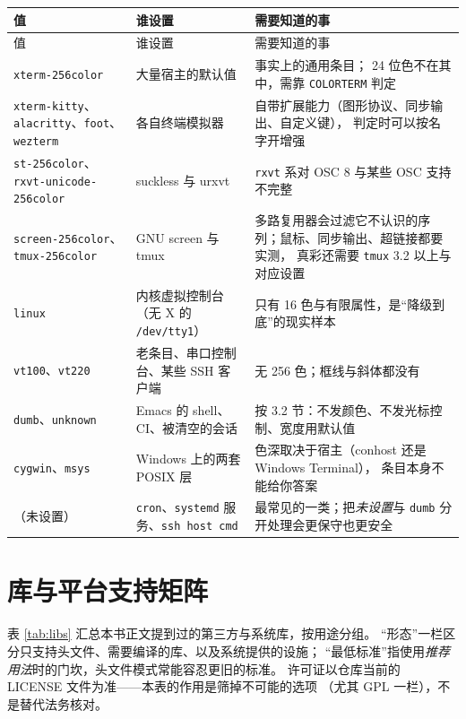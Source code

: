 \documentclass[12pt,a4paper,fontset=fandol]{ctexbook}
\newcommand{\Tp}[1]{\texttt{#1}}
\newcommand{\Bk}{\allowbreak}
\begin{document}
\begin{longtable}{@{}>{\raggedright\arraybackslash}p{}
                 >{\raggedright\arraybackslash}p{}
                 >{\raggedright\arraybackslash}p{}@{}}
\toprule
值 & 谁设置 & 需要知道的事 \\
\midrule
\endfirsthead
\toprule
值 & 谁设置 & 需要知道的事 \\
\midrule
\endhead
\Tp{xterm\Bk-256color} & 大量宿主的默认值 & 事实上的通用条目；
24 位色不在其中，需靠 \Tp{COLORTERM} 判定 \\
\Tp{xterm-kitty}、\Tp{alacritty}、\Tp{foot}、\Tp{wezterm} &
各自终端模拟器 & 自带扩展能力（图形协议、同步输出、自定义键），
判定时可以按名字开增强 \\
\Tp{st-256color}、\Tp{rxvt\Bk-unicode\Bk-256color} & suckless 与 urxvt &
\Tp{rxvt} 系对 OSC 8 与某些 OSC 支持不完整 \\
\Tp{screen\Bk-256color}、\Tp{tmux\Bk-256color} & GNU screen 与 tmux &
多路复用器会过滤它不认识的序列；鼠标、同步输出、超链接都要实测，
真彩还需要 \Tp{tmux} 3.2 以上与对应设置 \\
\Tp{linux} & 内核虚拟控制台（无 X 的 \Tp{/dev/tty1}） &
只有 16 色与有限属性，是``降级到底''的现实样本 \\
\Tp{vt100}、\Tp{vt220} & 老条目、串口控制台、某些 SSH 客户端 &
无 256 色；框线与斜体都没有 \\
\Tp{dumb}、\Tp{unknown} & Emacs 的 shell、CI、被清空的会话 &
按 3.2 节：不发颜色、不发光标控制、宽度用默认值 \\
\Tp{cygwin}、\Tp{msys} & Windows 上的两套 POSIX 层 &
色深取决于宿主（conhost 还是 Windows Terminal），
条目本身不能给你答案 \\
（未设置） & \Tp{cron}、\Tp{systemd} 服务、\lstinline|ssh host cmd| &
最常见的一类；把\emph{未设置}与 \Tp{dumb} 分开处理会更保守也更安全 \\
\bottomrule
\end{longtable}

\chapter{库与平台支持矩阵}

表 \ref{tab:libs} 汇总本书正文提到过的第三方与系统库，按用途分组。
``形态''一栏区分只支持头文件、需要编译的库、以及系统提供的设施；
``最低标准''指使用\emph{推荐用法}时的门坎，头文件模式常能容忍更旧的标准。
许可证以仓库当前的 LICENSE 文件为准——本表的作用是筛掉不可能的选项
（尤其 GPL 一栏），不是替代法务核对。
\end{document}
